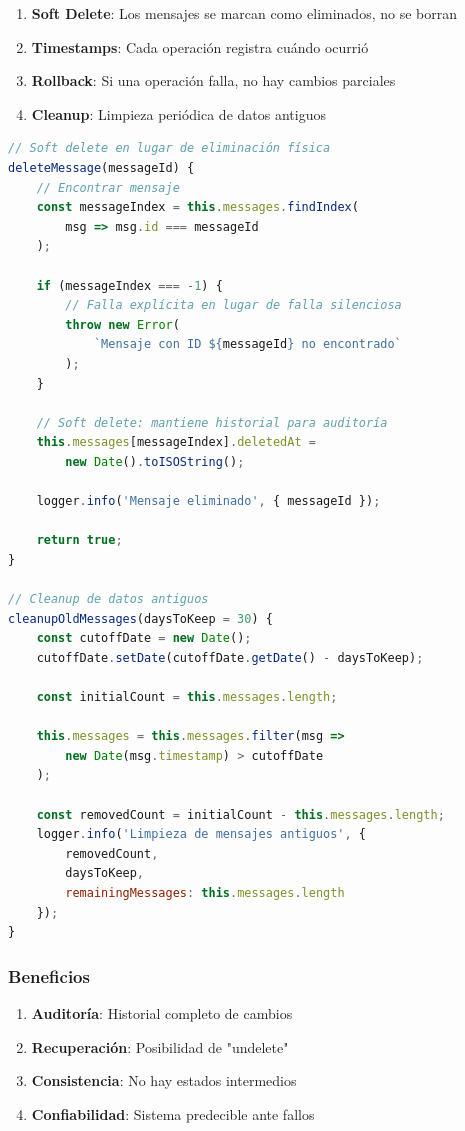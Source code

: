 \documentclass[12pt,a4paper]{article}
\begin{document}
\begin{enumerate}
    \item \textbf{Soft Delete}: Los mensajes se marcan como eliminados, no se borran
    \item \textbf{Timestamps}: Cada operación registra cuándo ocurrió
    \item \textbf{Rollback}: Si una operación falla, no hay cambios parciales
    \item \textbf{Cleanup}: Limpieza periódica de datos antiguos
\end{enumerate}

\begin{lstlisting}[caption=Resiliencia en MessageService, language=JavaScript]
// Soft delete en lugar de eliminación física
deleteMessage(messageId) {
    // Encontrar mensaje
    const messageIndex = this.messages.findIndex(
        msg => msg.id === messageId
    );

    if (messageIndex === -1) {
        // Falla explícita en lugar de falla silenciosa
        throw new Error(
            `Mensaje con ID ${messageId} no encontrado`
        );
    }

    // Soft delete: mantiene historial para auditoría
    this.messages[messageIndex].deletedAt = 
        new Date().toISOString();
    
    logger.info('Mensaje eliminado', { messageId });

    return true;
}

// Cleanup de datos antiguos
cleanupOldMessages(daysToKeep = 30) {
    const cutoffDate = new Date();
    cutoffDate.setDate(cutoffDate.getDate() - daysToKeep);

    const initialCount = this.messages.length;
    
    this.messages = this.messages.filter(msg => 
        new Date(msg.timestamp) > cutoffDate
    );

    const removedCount = initialCount - this.messages.length;
    logger.info('Limpieza de mensajes antiguos', { 
        removedCount, 
        daysToKeep,
        remainingMessages: this.messages.length 
    });
}
\end{lstlisting}

\subsubsection{Beneficios}
\begin{enumerate}
    \item \textbf{Auditoría}: Historial completo de cambios
    \item \textbf{Recuperación}: Posibilidad de "undelete"
    \item \textbf{Consistencia}: No hay estados intermedios
    \item \textbf{Confiabilidad}: Sistema predecible ante fallos
\end{enumerate}
\end{document}
